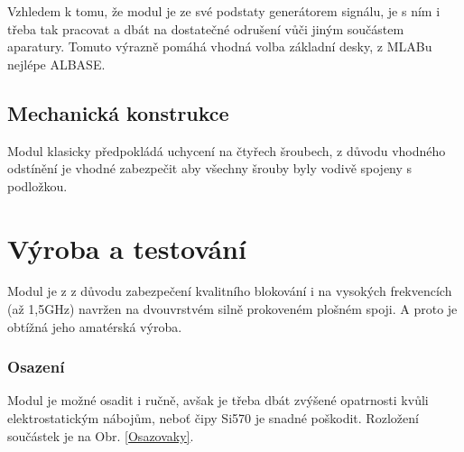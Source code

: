\documentclass[12pt,a4paper,oneside]{article}
\begin{document}
Vzhledem k tomu, že modul je ze své podstaty generátorem signálu, je s ním i třeba tak pracovat a dbát na dostatečné odrušení vůči jiným součástem aparatury. Tomuto výrazně pomáhá vhodná volba základní desky, z MLABu nejlépe ALBASE.

\subsection{Mechanická konstrukce}

Modul klasicky předpokládá uchycení na čtyřech šroubech, z důvodu vhodného odstínění je vhodné zabezpečit aby všechny šrouby byly vodivě spojeny s podložkou.  

\section{Výroba a testování}
Modul je z z důvodu zabezpečení kvalitního blokování i na vysokých frekvencích (až 1,5GHz) navržen na dvouvrstvém silně prokoveném plošném spoji. A proto je obtížná jeho amatérská výroba.

\subsubsection{Osazení}

Modul je možné osadit i ručně, avšak je třeba dbát zvýšené opatrnosti kvůli elektrostatickým nábojům, neboť čipy Si570 je snadné poškodit. Rozložení součástek je na Obr. \ref{Osazovaky}.


\newpage
\end{document}
